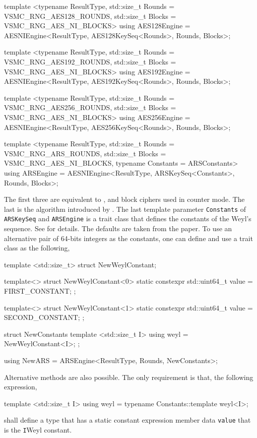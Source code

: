 \begin{cppcode}
  template <typename ResultType, std::size_t Rounds = VSMC_RNG_AES128_ROUNDS,
      std::size_t Blocks = VSMC_RNG_AES_NI_BLOCKS>
  using AES128Engine =
      AESNIEngine<ResultType, AES128KeySeq<Rounds>, Rounds, Blocks>;

  template <typename ResultType, std::size_t Rounds = VSMC_RNG_AES192_ROUNDS,
      std::size_t Blocks = VSMC_RNG_AES_NI_BLOCKS>
  using AES192Engine =
      AESNIEngine<ResultType, AES192KeySeq<Rounds>, Rounds, Blocks>;

  template <typename ResultType, std::size_t Rounds = VSMC_RNG_AES256_ROUNDS,
      std::size_t Blocks = VSMC_RNG_AES_NI_BLOCKS>
  using AES256Engine =
      AESNIEngine<ResultType, AES256KeySeq<Rounds>, Rounds, Blocks>;

  template <typename ResultType, std::size_t Rounds = VSMC_RNG_ARS_ROUNDS,
      std::size_t Blocks = VSMC_RNG_AES_NI_BLOCKS,
      typename Constants = ARSConstants>
  using ARSEngine =
      AESNIEngine<ResultType, ARSKeySeq<Constants>, Rounds, Blocks>;
\end{cppcode}
The first three are equivalent to ,  and  block ciphers
used in counter mode. The last is the \ars algorithm introduced by
\textcite{Salmon:2011um}. The last template parameter \verb|Constants| of
\verb|ARSKeySeq| and \verb|ARSEngine| is a trait class that defines the
constants of the Weyl's sequence. See \textcite{Salmon:2011um} for details. The
defaults are taken from the paper. To use an alternative pair of 64-bits
integers as the constants, one can define and use a trait class as the
following,
\begin{cppcode}
  template <std::size_t>
  struct NewWeylConstant;

  template<>
  struct NewWeylConstant<0>
  {
      static constexpr std::uint64_t value = FIRST_CONSTANT;
  };

  template<>
  struct NewWeylConstant<1>
  {
      static constexpr std::uint64_t value = SECOND_CONSTANT;
  };

  struct NewConstants
  {
      template <std::size_t I>
      using weyl = NewWeylConstant<I>;
  };

  using NewARS = ARSEngine<ResultType, Rounds, NewConstants>;
\end{cppcode}
Alternative methods are also possible. The only requirement is that, the
following expression,
\begin{cppcode}
  template <std::size_t I>
  using weyl = typename Constants::template weyl<I>;
\end{cppcode}
shall define a type that has a static constant expression member data
\verb|value| that is the \verb|I|\ith Weyl constant.

